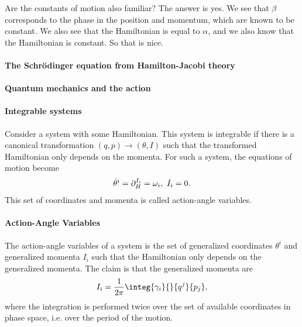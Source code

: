 Are the constants of motion also familiar? The answer is yes. We see that $\beta$ corresponds to the phase in the position and momentum, which are known to be constant. We also see that the Hamiltonian is equal to $\alpha$, and we also know that the Hamiltonian is constant. So that is nice.


\paragraph{The Schrödinger equation from Hamilton-Jacobi theory}

\paragraph{Quantum mechanics and the action}

\paragraph{Integrable systems}
Consider a system with some Hamiltonian. This system is integrable if there is a canonical transformation $(q, p)\to (\theta, I)$ such that the transformed Hamiltonian only depends on the momenta. For such a system, the equations of motion become
\begin{align*}
	\dot{\theta}^{i} = \partial^{I_{i}}_{H} = \omega_{i},\ \dot{I}_{i} = 0.
\end{align*}
This set of coordinates and momenta is called action-angle variables.

\paragraph{Action-Angle Variables}
The action-angle variables of a system is the set of generalized coordinates $\theta^{i}$ and generalized momenta $I_{i}$ such that the Hamiltonian only depends on the generalized momenta. The claim is that the generalized momenta are
\begin{align*}
	I_{i} = \frac{1}{2\pi}\integ{\gamma_{i}}{}{q^{j}}{p_{j}},
\end{align*}
where the integration is performed twice over the set of available coordinates in phase space, i.e. over the period of the motion.

